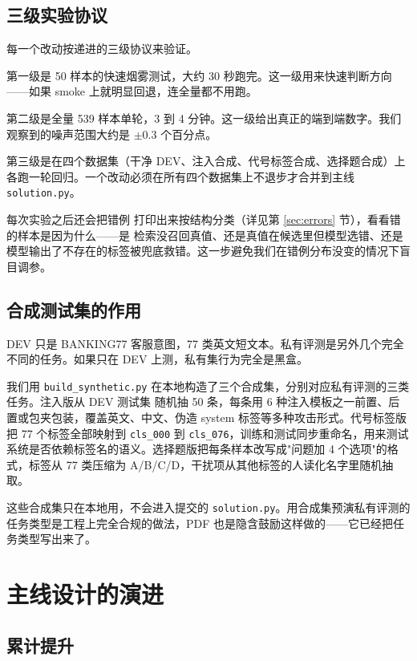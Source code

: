 \documentclass[11pt,a4paper]{article}
\begin{document}
\subsection{三级实验协议}

每一个改动按递进的三级协议来验证。

第一级是 50 样本的快速烟雾测试，大约 30 秒跑完。这一级用来快速判断方向——如果 smoke 上就明显回退，连全量都不用跑。

第二级是全量 539 样本单轮，3 到 4 分钟。这一级给出真正的端到端数字。我们观察到的噪声范围大约是 $\pm 0.3$ 个百分点。

第三级是在四个数据集（干净 DEV、注入合成、代号标签合成、选择题合成）上各跑一轮回归。一个改动必须在所有四个数据集上不退步才合并到主线 \texttt{solution.py}。

每次实验之后还会把错例 打印出来按结构分类（详见第 \ref{sec:errors} 节），看看错的样本是因为什么——是 检索没召回真值、还是真值在候选里但模型选错、还是模型输出了不存在的标签被兜底救错。这一步避免我们在错例分布没变的情况下盲目调参。

\subsection{合成测试集的作用}

DEV 只是 BANKING77 客服意图，77 类英文短文本。私有评测是另外几个完全不同的任务。如果只在 DEV 上测，私有集行为完全是黑盒。

我们用 \texttt{build\_synthetic.py} 在本地构造了三个合成集，分别对应私有评测的三类任务。注入版从 DEV 测试集 随机抽 50 条，每条用 6 种注入模板之一前置、后置或包夹包装，覆盖英文、中文、伪造 system 标签等多种攻击形式。代号标签版把 77 个标签全部映射到 \texttt{cls\_000} 到 \texttt{cls\_076}，训练和测试同步重命名，用来测试系统是否依赖标签名的语义。选择题版把每条样本改写成"问题加 4 个选项"的格式，标签从 77 类压缩为 A/B/C/D，干扰项从其他标签的人读化名字里随机抽取。

这些合成集只在本地用，不会进入提交的 \texttt{solution.py}。用合成集预演私有评测的任务类型是工程上完全合规的做法，PDF 也是隐含鼓励这样做的——它已经把任务类型写出来了。

\section{主线设计的演进}
\label{sec:main}

\subsection{累计提升}
\end{document}

